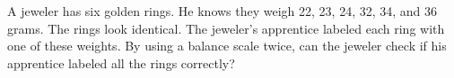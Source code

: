 A jeweler has six golden rings. He knows they weigh 22, 23, 24, 32, 34, and 36 grams. The rings look identical. The jeweler's apprentice labeled each ring with one of these weights. By using a balance scale twice, can the jeweler check if his apprentice labeled all the rings correctly?

